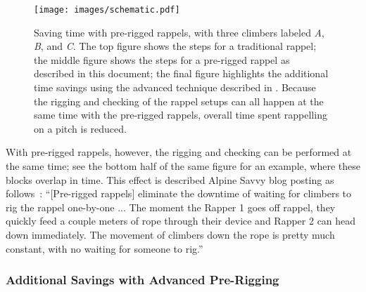 \documentclass[nonacm,acmtog]{acmart}
\begin{document}
  \begin{figure}
   \texttt{[image: images/schematic.pdf]}
   \caption{Saving time with pre-rigged rappels, with three climbers labeled
   {\it A}, {\it B}, and {\it C}.  The top figure shows the steps for a
   traditional rappel; the middle figure shows the steps for a pre-rigged
   rappel as described in this document; the final figure highlights the
   additional time savings using the advanced technique described in
   .  Because the rigging and checking of the rappel
   setups can all happen at the same time with the pre-rigged rappels, overall
   time spent rappelling on a pitch is reduced.} \label{fig:schematic}
  \end{figure}

  With pre-rigged rappels, however, the rigging and checking can be performed
  at the same time; see the bottom half of the same figure for an example,
  where these blocks overlap in time.  This effect is described Alpine Savvy
  blog posting as follows~\cite{alpinesavvy:pre-rigged-rappels}: ``[Pre-rigged
  rappels] eliminate the downtime of waiting for climbers to rig the rappel
  one-by-one ...  The moment the Rapper 1 goes off rappel, they quickly feed a
  couple meters of rope through their device and Rapper 2 can head down
  immediately. The movement of climbers down the rope is pretty much constant,
  with no waiting for someone to rig.''



\subsubsection{Additional Savings with Advanced Pre-Rigging}
\label{sec:advanced}
\end{document}
